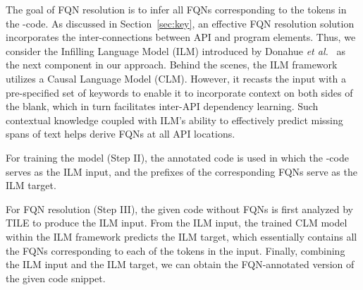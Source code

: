 
The goal of FQN resolution is to infer all FQNs corresponding to the
\blank tokens in the \blank-code. As discussed in
Section~\ref{sec:key}, an effective FQN resolution solution
incorporates the inter-connections between API and program
elements. Thus, we consider the Infilling Language Model (ILM)
introduced by Donahue {\em et al.}~\cite{donahue-etal-2020-enabling} as the next component in
our approach. 
Behind the scenes, the ILM framework utilizes a Causal Language Model (CLM).
However, it recasts the input with a pre-specified set of keywords to
enable it to incorporate context on both sides of the
blank, which in turn facilitates inter-API dependency learning.
Such
contextual knowledge coupled with ILM's ability to effectively predict
missing spans of text helps \tool derive FQNs at all API
locations.

For training the model (Step II), the annotated code is 
used in which the \blank-code serves as the ILM input, and the prefixes
of the corresponding FQNs serve as the ILM target.

For FQN resolution (Step III), the given code without FQNs is first analyzed
by TILE to produce the ILM input. 
From the ILM input, the trained CLM model within the ILM framework predicts the ILM target, which essentially contains all the FQNs corresponding to each of the \blank tokens in the input.
Finally, combining the ILM input and the
ILM target, we can obtain the 
FQN-annotated version of the given code snippet.



